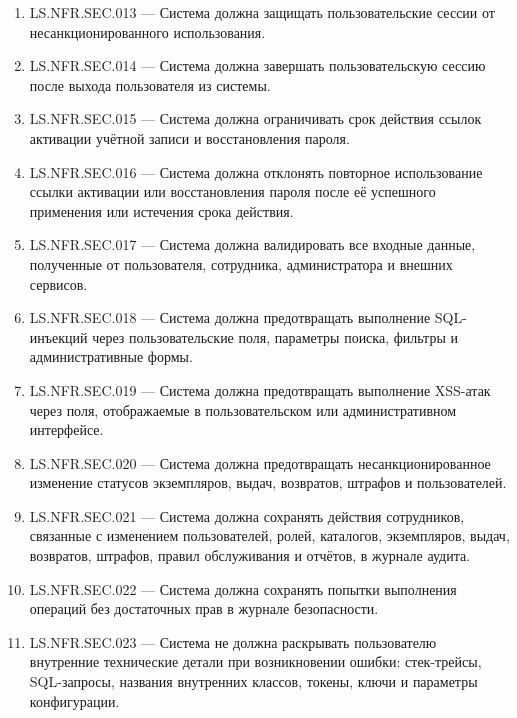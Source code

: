 \documentclass[12pt,a4paper]{article}
\begin{document}
\begin{enumerate}
		\item LS.NFR.SEC.013 --- Система должна защищать пользовательские сессии
		от несанкционированного использования.
		
		\item LS.NFR.SEC.014 --- Система должна завершать пользовательскую сессию
		после выхода пользователя из системы.
		
		\item LS.NFR.SEC.015 --- Система должна ограничивать срок действия ссылок
		активации учётной записи и восстановления пароля.
		
		\item LS.NFR.SEC.016 --- Система должна отклонять повторное использование
		ссылки активации или восстановления пароля после её успешного применения
		или истечения срока действия.
		
		\item LS.NFR.SEC.017 --- Система должна валидировать все входные данные,
		полученные от пользователя, сотрудника, администратора и внешних сервисов.
		
		\item LS.NFR.SEC.018 --- Система должна предотвращать выполнение SQL-инъекций
		через пользовательские поля, параметры поиска, фильтры и административные формы.
		
		\item LS.NFR.SEC.019 --- Система должна предотвращать выполнение XSS-атак
		через поля, отображаемые в пользовательском или административном интерфейсе.
		
		\item LS.NFR.SEC.020 --- Система должна предотвращать несанкционированное
		изменение статусов экземпляров, выдач, возвратов, штрафов и пользователей.
		
		\item LS.NFR.SEC.021 --- Система должна сохранять действия сотрудников,
		связанные с изменением пользователей, ролей, каталогов, экземпляров, выдач,
		возвратов, штрафов, правил обслуживания и отчётов, в журнале аудита.
		
		\item LS.NFR.SEC.022 --- Система должна сохранять попытки выполнения операций
		без достаточных прав в журнале безопасности.
		
		\item LS.NFR.SEC.023 --- Система не должна раскрывать пользователю внутренние
		технические детали при возникновении ошибки: стек-трейсы, SQL-запросы,
		названия внутренних классов, токены, ключи и параметры конфигурации.
		

\end{enumerate}
\end{document}
